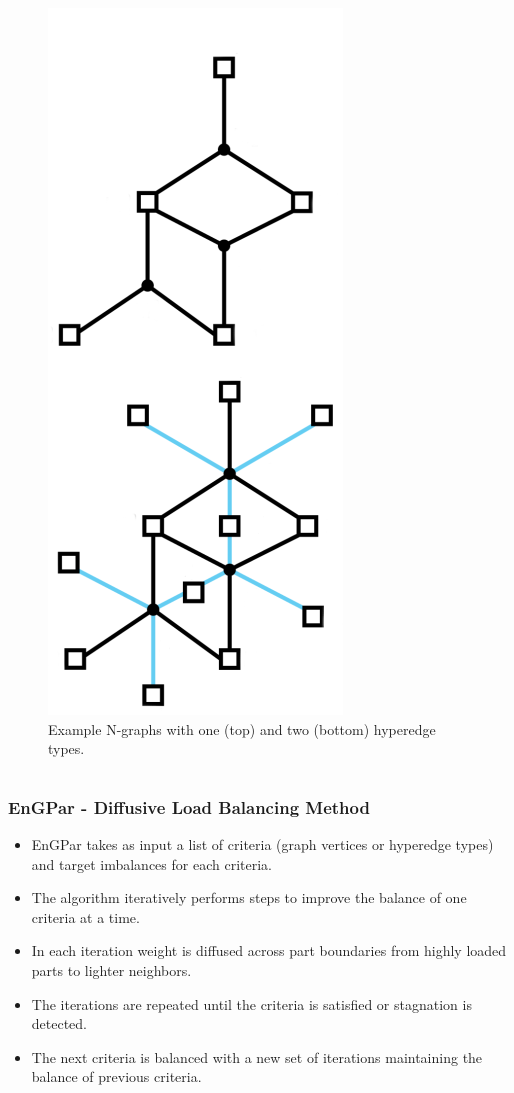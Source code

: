 \documentclass[aspectratio=169]{beamer}
\begin{document}
\begin{frame}
\begin{columns}
\begin{column}{.25\textwidth}
\begin{figure}
        \includegraphics[height=.6\textheight]{examplegraphs.png}
        \caption*{Example N-graphs with one (top) and two (bottom) hyperedge types.}
      \end{figure}
    \end{column}
    \end{columns}
\end{frame}

\begin{frame}
  \frametitle{EnGPar - Diffusive Load Balancing Method}
  \begin{itemize}
  \item EnGPar takes as input a list of criteria (graph vertices or hyperedge types) and target imbalances for each criteria.
  \item The algorithm iteratively performs steps to improve the balance of one criteria at a time.
  \item In each iteration weight is diffused across part boundaries from highly loaded parts to lighter neighbors.
  \item The iterations are repeated until the criteria is satisfied or stagnation is detected.
  \item The next criteria is balanced with a new set of iterations maintaining the balance of previous criteria.
  \end{itemize}
\end{frame}
\end{document}
